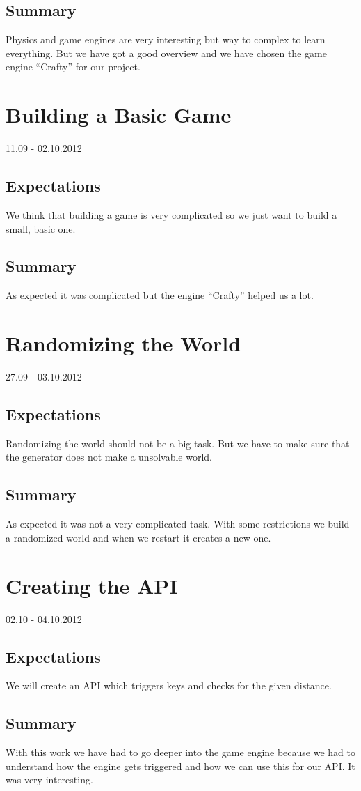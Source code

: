 \subsection*{Summary}
Physics and game engines are very interesting but way to complex to learn everything. But we have got a good overview and we have chosen the game engine ``Crafty'' for our project.

\section{Building a Basic Game}
11.09 - 02.10.2012
\subsection*{Expectations}
We think that building a game is very complicated so we just want to build a small, basic one.
\subsection*{Summary}
As expected it was complicated but the engine ``Crafty'' helped us a lot.

\section{Randomizing the World}
27.09 - 03.10.2012
\subsection*{Expectations}
Randomizing the world should not be a big task. But we have to make sure that the generator does not make a unsolvable world.
\subsection*{Summary}
As expected it was not a very complicated task. With some restrictions we build a randomized world and when we restart it creates a new one.

\section{Creating the API}
02.10 - 04.10.2012
\subsection*{Expectations}
We will create an API which triggers keys and checks for the given distance.
\subsection*{Summary}
With this work we have had to go deeper into the game engine because we had to understand how the engine gets triggered and how we can use this for our API. It was very interesting.

